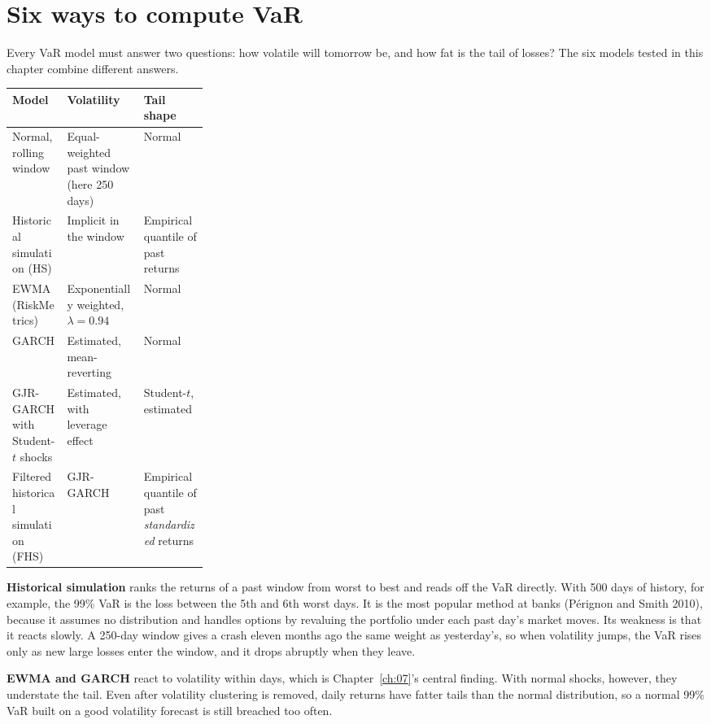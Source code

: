 \section{Six ways to compute VaR}
\label{sec:11-how}

Every VaR model must answer two questions: how volatile will tomorrow be, and how fat is the tail of losses? The six models tested in this chapter combine different answers.

\begin{center}
\small
\begin{tabularx}{0.9\linewidth}{@{}>{\raggedright\arraybackslash}p{0.28\linewidth}>{\raggedright\arraybackslash}X>{\raggedright\arraybackslash}X@{}}
\toprule
Model & Volatility & Tail shape \\
\midrule
Normal, rolling window & Equal-weighted past window (here 250 days) & Normal \\
Historical simulation (HS) & Implicit in the window & Empirical quantile of past returns \\
EWMA (RiskMetrics) & Exponentially weighted, $\lambda = 0.94$ & Normal \\
GARCH & Estimated, mean-reverting & Normal \\
GJR-GARCH with Student-$t$ shocks & Estimated, with leverage effect & Student-$t$, estimated \\
Filtered historical simulation (FHS) & GJR-GARCH & Empirical quantile of past \emph{standardized} returns \\
\bottomrule
\end{tabularx}
\end{center}

\textbf{Historical simulation} ranks the returns of a past window from worst to best and reads off the VaR directly. With 500 days of history, for example, the 99\% VaR is the loss between the 5th and 6th worst days. It is the most popular method at banks (P\'erignon and Smith 2010), because it assumes no distribution and handles options by revaluing the portfolio under each past day's market moves. Its weakness is that it reacts slowly. A 250-day window gives a crash eleven months ago the same weight as yesterday's, so when volatility jumps, the VaR rises only as new large losses enter the window, and it drops abruptly when they leave.

\textbf{EWMA and GARCH} react to volatility within days, which is Chapter~\ref{ch:07}'s central finding. With normal shocks, however, they understate the tail. Even after volatility clustering is removed, daily returns have fatter tails than the normal distribution, so a normal 99\% VaR built on a good volatility forecast is still breached too often.

